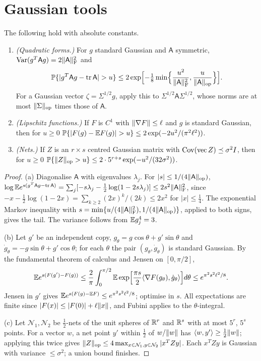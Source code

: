 \section{Gaussian tools}\label{app:gauss}

\begin{lemma}\label{lem:gauss}
The following hold with absolute constants.
\begin{enumerate}[label=(\alph*)]
\item \emph{(Quadratic forms.)} For $g$ standard Gaussian and $\mathsf A$
symmetric, $\operatorname{Var}(g^T\mathsf Ag)=2\lVert \mathsf A\rVert_{\mathrm F}^2$ and
\[
 \Prob\{|g^T\mathsf Ag-\tr\mathsf A|>u\}\le2\exp\Bigl[-\tfrac18\min\Bigl\{\frac{u^2}{\fro{\mathsf A}^2},\frac u{\opn{\mathsf A}}\Bigr\}\Bigr].
\]
For a Gaussian vector $\zeta=\Sigma^{1/2}g$, apply this to
$\Sigma^{1/2}\mathsf A\Sigma^{1/2}$, whose norms are at most $\lVert \Sigma\rVert_{\mathrm{op}}$ times those of
$\mathsf A$.
\item \emph{(Lipschitz functions.)} If $F$ is $C^1$ with $\lVert \nabla F\rVert\le\ell$
and $g$ is standard Gaussian, then for $u\ge0$
$\Prob\{|F(g)-\E F(g)|>u\}\le2\exp(-2u^2/(\pi^2\ell^2))$.
\item \emph{(Nets.)} If $Z$ is an $r\times s$ centred Gaussian matrix with
$\operatorname{Cov}(\mathrm{vec}\,Z)\preceq\sigma^2I$, then for $u\ge0$
$\mathbb P\{\lVert Z\rVert_{\mathrm{op}}>u\}\le2\cdot5^{r+s}\exp(-u^2/(32\sigma^2))$.
\end{enumerate}
\end{lemma}

\begin{proof}
(a) Diagonalise $\mathsf A$ with eigenvalues $\lambda_j$. For $|s|\le1/(4\lVert \mathsf A\rVert_{\mathrm{op}})$,
$\log\mathbb E e^{s(g^T\mathsf Ag-\operatorname{tr}\mathsf A)}=\sum_j[-s\lambda_j-\frac12\log(1-2s\lambda_j)]
\le2s^2\lVert \mathsf A\rVert_{\mathrm F}^2$, since $-x-\frac12\log(1-2x)=\sum_{k\ge2}(2x)^k/(2k)\le2x^2$
for $|x|\le\frac14$. The exponential Markov inequality with
$s=\min\{u/(4\lVert \mathsf A\rVert_{\mathrm F}^2),1/(4\lVert \mathsf A\rVert_{\mathrm{op}})\}$, applied to both signs,
gives the tail. The variance follows from $\mathbb E g_j^4=3$.

(b) Let $g'$ be an independent copy, $g_\theta=g\cos\theta+g'\sin\theta$ and
$\dot g_\theta=-g\sin\theta+g'\cos\theta$; for each $\theta$ the pair
$(g_\theta,\dot g_\theta)$ is standard Gaussian. By the fundamental theorem of
calculus and Jensen on $[0,\pi/2]$,
\[
 \mathbb E e^{s(F(g')-F(g))}\le\frac2\pi\int_0^{\pi/2}\mathbb E\exp\Bigl[\frac{\pi s}2\langle \nabla
 F(g_\theta),\dot g_\theta\rangle\Bigr]d\theta\le e^{\pi^2s^2\ell^2/8}.
\]
Jensen in $g'$ gives $\mathbb E e^{s(F(g)-\mathbb E F)}\le e^{\pi^2s^2\ell^2/8}$; optimise in $s$.
All expectations are finite since $|F(x)|\le|F(0)|+\ell\lVert x\rVert$, and Fubini
applies to the $\theta$-integral.

(c) Let $\mathcal N_1,\mathcal N_2$ be $\frac12$-nets of the unit spheres of $\mathbb R^r$
and $\mathbb R^s$ with at most $5^r$, $5^s$ points. For a vector $w$, a net point $y'$
within $\frac12$ of $w/\lVert w\rVert$ has $\langle w,y'\rangle\ge\frac12\lVert w\rVert$; applying this
twice gives $\lVert Z\rVert_{\mathrm{op}}\le4\max_{x\in\mathcal N_1,y\in\mathcal N_2}|x^TZy|$. Each
$x^TZy$ is Gaussian with variance $\le\sigma^2$; a union bound finishes.
\end{proof}

